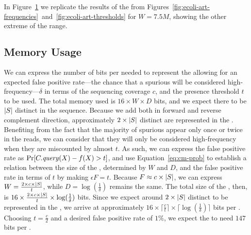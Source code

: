 In Figure~\ref{fig:ecoli-art-W7500000} we replicate the results of the \dBCM from Figures~\ref{fig:ecoli-art-frequencies}~and~\ref{fig:ecoli-art-thresholds} for $W = 7.5M$, showing the other extreme of the range. 

\begin{figure}[htbp]
    \centering
    \caption{}\label{fig:ecoli-art-W7500000}
\end{figure}



\subsection{Memory Usage}

We can express the number of bits per \kmer needed to represent the \dBG allowing for an expected false positive rate---the chance that a spurious \kmer will be considered high-frequency---$\delta$ in terms of the sequencing coverage $c$, and the presence threshold $t$ to be used. The total memory used is $16 \times W \times D$ bits, and we expect there to be $|\strname{S}|$ distinct  in the sequence. Because we add  both in forward and reverse complement direction, approximately $2 \times |\strname{S}|$ distinct  are represented in the \dBG. Benefiting from the fact that the majority of spurious  appear only once or twice in the reads, we can consider that they will only be considered high-frequency when they are miscounted by almost $t$. As such, we can express the false positive rate as $\mathrm{Pr}[C.\mathit{query}(X) - f(X) > t]$, and use Equation~\ref{eq:cm-prob} to establish a relation between the size of the \dBCM, determined by $W$ and $D$, and the false positive rate in terms of $t$ by making $\epsilon F = t$. Because $F \approx c \times |\strname{S}|$, we can express $W = \frac{2 \times c \times |\strname{S}|}{t}$, while $D = \log(\frac{1}{\delta})$ remains the same. The total size of the \dBCM, then, is $16 \times \frac{2 \times c \times |\strname{S}|}{t} \times \log(\frac{1}{\delta})$ bits. Since we expect around $2 \times |\strname{S}|$ distinct  to be represented in the \dBG, we arrive at approximately $16 \times \lceil \frac{c}{t} \rceil \times \lceil \log(\frac{1}{\delta}) \rceil$ bits per \kmer. Choosing $t = \frac{c}{2}$ and a desired false positive rate of $1\%$, we expect the \dBCM to need $147$ bits per \kmer.

